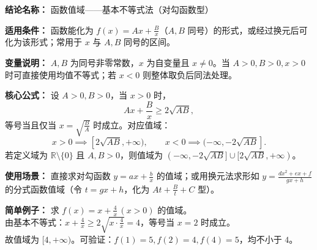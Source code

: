 \textbf{结论名称：} 函数值域——基本不等式法（对勾函数型）

\textbf{适用条件：} 函数能化为 \(f(x)=Ax+\frac{B}{x}\)（\(A,B\) 同号）的形式，或经过换元后可化为该形式；常用于 \(x\) 与 \(A,B\) 同号的区间。

\textbf{变量说明：} \(A,B\) 为同号非零常数，\(x\) 为自变量且 \(x\neq 0\)。当 \(A>0,B>0,x>0\) 时可直接使用均值不等式；若 \(x<0\) 则整体取负后同法处理。

\textbf{核心公式：} 设 \(A>0,B>0\)，当 \(x>0\) 时，
\[
\boxed{Ax+\frac{B}{x}\ge 2\sqrt{AB}},
\]
等号当且仅当 \(x=\sqrt{\frac{B}{A}}\) 时成立。对应值域：
\[
x>0\implies [2\sqrt{AB},+\infty),\qquad x<0\implies (-\infty,-2\sqrt{AB}].
\]
若定义域为 \(\mathbb{R}\setminus\{0\}\) 且 \(A,B>0\)，则值域为 \((-\infty,-2\sqrt{AB}]\cup[2\sqrt{AB},+\infty)\)。

\textbf{使用场景：} 直接求对勾函数 \(y=ax+\frac{b}{x}\) 的值域；或用换元法求形如 \(y=\frac{dx^2+ex+f}{gx+h}\) 的分式函数值域（令 \(t=gx+h\)，化为 \(At+\frac{B}{t}+C\) 型）。

\textbf{简单例子：} 求 \(f(x)=x+\frac{4}{x}\,(x>0)\) 的值域。\\
由基本不等式：\(x+\frac{4}{x}\ge 2\sqrt{x\cdot\frac{4}{x}}=4\)，等号当 \(x=2\) 时成立。\\
故值域为 \([4,+\infty)\)。可验证：\(f(1)=5,f(2)=4,f(4)=5\)，均不小于 \(4\)。